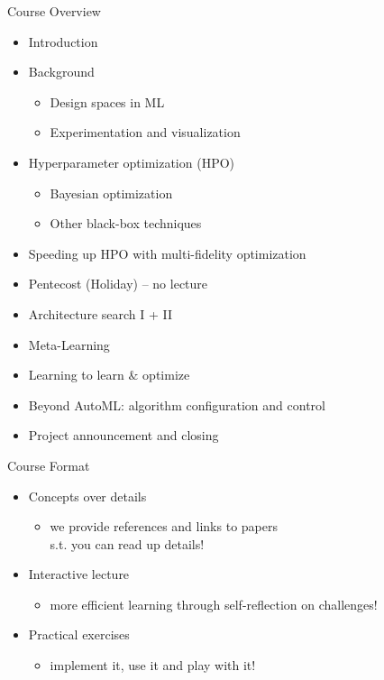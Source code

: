 \begin{frame}[c]{Course Overview}

\begin{itemize}
	\item Introduction
	\item Background
	\begin{itemize}
		\item Design spaces in ML
		\item Experimentation and visualization
	\end{itemize}
	\item Hyperparameter optimization (HPO)
	\begin{itemize}
	  \item Bayesian optimization
	  \item Other black-box techniques
	\end{itemize}
	\item Speeding up HPO with multi-fidelity optimization
	\item Pentecost (Holiday) -- no lecture
	\item Architecture search I + II
	\item Meta-Learning
	\item Learning to learn $\&$ optimize
	\item Beyond AutoML: algorithm configuration and control
	\item Project announcement and closing
\end{itemize}


\end{frame}
\begin{frame}[c]{Course Format}

\begin{itemize}
	\item Concepts over details
	\begin{itemize}
	  \item we provide references and links to papers\\ s.t. you can read up details!
	\end{itemize}
	\smallskip
	\item Interactive lecture
	\begin{itemize}
	  \item more efficient learning through self-reflection on challenges!
	\end{itemize}
	\smallskip
	\item Practical exercises
	\begin{itemize}
	  \item implement it, use it and play with it!
	\end{itemize}
\end{itemize}

\end{frame}
